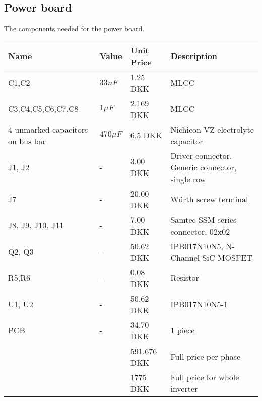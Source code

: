 \subsection{Power board}
The components needed for the power board.
\begin{table}[H]
\centering
\footnotesize
\begin{tabular}{|p{4cm} p{1.5cm} p{2.2cm} p{6cm}|} \hline
\textbf{Name}    & \textbf{Value} & \textbf{Unit Price}
& \textbf{Description}                            \\ \hline
C1,C2             & $33nF$         & 1.25 DKK      & MLCC                                            \\
C3,C4,C5,C6,C7,C8 & $1\mu F$       & 2.169 DKK     & MLCC                                            \\
4 unmarked capacitors on bus bar  & $470 \mu F$   & 6.5 DKK & Nichicon VZ electrolyte capacitor        \\
J1, J2            &  -             & 3.00 DKK      & Driver connector. Generic connector, single row \\
J7                & -              & 20.00 DKK     & Würth screw terminal                      \\
J8, J9, J10, J11  & -              & 7.00 DKK      & Samtec SSM series connector, 02x02            \\
Q2, Q3            & -              & 50.62 DKK     & IPB017N10N5, N-Channel SiC MOSFET               \\
R5,R6             & -              & 0.08 DKK      & Resistor                                        \\
U1, U2            & -              & 50.62 DKK     & IPB017N10N5-1 \\ 
PCB               & -              & 34.70 DKK     & 1 piece    \\\hline
&& 591.676 DKK & Full price per phase \\ \hline
&& 1775 DKK & Full price for whole inverter \\ \hline
\end{tabular}
\end{table}

\newpage
